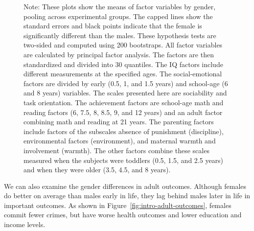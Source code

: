 \begin{figure}
Note: These plots show the means of factor variables by gender, pooling across experimental groups. The capped lines show the standard errors and black points indicate that the female is significantly different than the males. These hypothesis tests are two-sided and computed using 200 bootstraps. All factor variables are calculated by principal factor analysis. The factors are then standardized and divided into 30 quantiles. The IQ factors include different measurements at the specified ages. The social-emotional factors are divided by early (0.5, 1, and 1.5 years) and school-age (6 and 8 years) variables. The scales presented here are sociability and task orientation. The achievement factors are school-age math and reading factors (6, 7.5, 8, 8.5, 9, and 12 years) and an adult factor combining math and reading at 21 years. The parenting factors include factors of the subscales absence of punishment (discipline), environmental factors (environment), and maternal warmth and involvement (warmth). The other factors combine these scales measured when the subjects were toddlers (0.5, 1.5, and 2.5 years) and when they were older (3.5, 4.5, and 8 years).
\end{figure}

We can also examine the gender differences in adult outcomes. Although females do better on average than males early in life, they lag behind males later in life in important outcomes. As shown in Figure~\ref{fig:intro-adult-outcomes}, females commit fewer crimes, but have worse health outcomes and lower education and income levels. 


